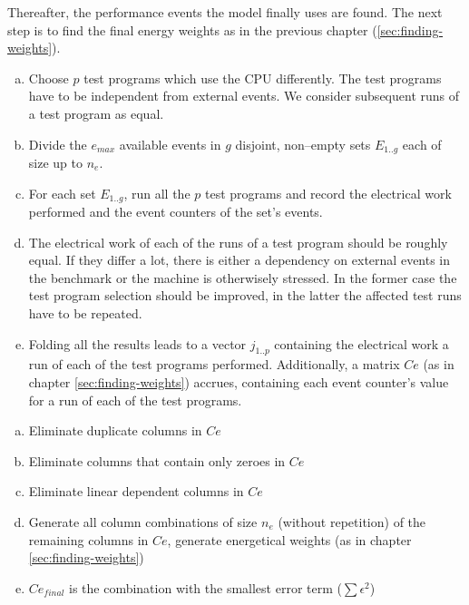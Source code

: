 Thereafter, the performance events the model finally uses are found. The next
step is to find the final energy weights as in the previous chapter
(\ref{sec:finding-weights}).



\begin{enumerate}[(a)]

\item Choose $p$ test programs which use the CPU differently. The test
programs have to be independent from external events. We consider subsequent
runs of a test program as equal.

\item Divide the $e_{max}$ available events in $g$ disjoint, non--empty sets
$E_{1..g}$ each of size up to $n_e$.

\item For each set $E_{1..g}$, run all the $p$ test programs and record the
electrical work performed and the event counters of the set's events.

\item The electrical work of each of the runs of a test program should be
roughly equal. If they differ a lot, there is either a dependency on external
events in the benchmark or the machine is otherwisely stressed. In the former
case the test program selection should be improved, in the latter the affected
test runs have to be repeated.

\item Folding all the results leads to a vector $j_{1..p}$ containing the
electrical work a run of each of the test programs performed. Additionally, a
matrix $Ce$ (as in chapter \ref{sec:finding-weights}) accrues, containing each
event counter's value for a run of each of the test programs.

\end{enumerate}


\begin{enumerate}[(a)]

\item Eliminate duplicate columns in $Ce$

\item Eliminate columns that contain only zeroes in $Ce$

\item Eliminate linear dependent columns in $Ce$

\item Generate all column combinations of size $n_e$ (without repetition) of the
remaining columns in $Ce$, generate energetical weights (as in chapter
\ref{sec:finding-weights})

\item $Ce_{final}$ is the combination with the smallest error term
($\sum\epsilon^2$)

\end{enumerate}

